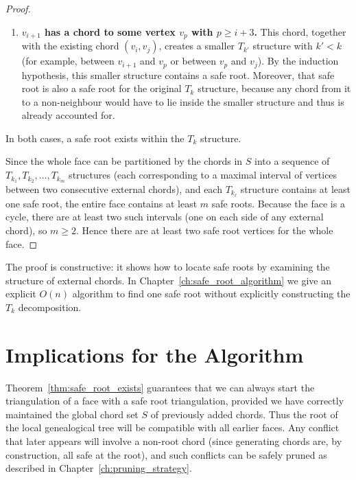 \begin{proof}
\begin{enumerate}
        \item \textbf{\(v_{i+1}\) has a chord to some vertex \(v_p\) with \(p \ge i+3\).} 
        This chord, together with the existing chord \((v_i, v_j)\), creates a smaller \(T_{k'}\) structure with \(k' < k\) (for example, between \(v_{i+1}\) and \(v_p\) or between \(v_p\) and \(v_j\)). 
        By the induction hypothesis, this smaller structure contains a safe root. 
        Moreover, that safe root is also a safe root for the original \(T_k\) structure, because any chord from it to a non-neighbour would have to lie inside the smaller structure and thus is already accounted for.
    \end{enumerate}
    In both cases, a safe root exists within the \(T_k\) structure.

    Since the whole face can be partitioned by the chords in \(S\) into a sequence of \(T_{k_1}, T_{k_2}, \dots, T_{k_m}\) structures (each corresponding to a maximal interval of vertices between two consecutive external chords), and each \(T_{k_\ell}\) structure contains at least one safe root, the entire face contains at least \(m\) safe roots. 
    Because the face is a cycle, there are at least two such intervals (one on each side of any external chord), so \(m \ge 2\). 
    Hence there are at least two safe root vertices for the whole face.
\end{proof}

\begin{remark}
    The proof is constructive: it shows how to locate safe roots by examining the structure of external chords. 
    In Chapter~\ref{ch:safe_root_algorithm} we give an explicit \(O(n)\) algorithm to find one safe root without explicitly constructing the \(T_k\) decomposition.
\end{remark}

\section{Implications for the Algorithm}
\label{sec:existence_implications}

Theorem~\ref{thm:safe_root_exists} guarantees that we can always start the triangulation of a face with a safe root triangulation, provided we have correctly maintained the global chord set \(S\) of previously added chords. 
Thus the root of the local genealogical tree will be compatible with all earlier faces. 
Any conflict that later appears will involve a non-root chord (since generating chords are, by construction, all safe at the root), and such conflicts can be safely pruned as described in Chapter~\ref{ch:pruning_strategy}.

